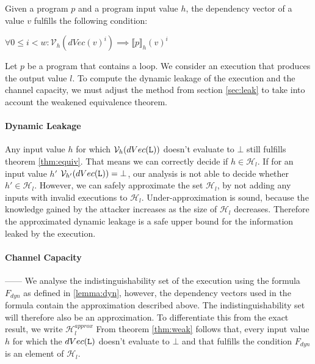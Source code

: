 \begin{theorem}\label{thm:weak}
    Given a program $p$ and a program input value $h$, the dependency vector of a value $v$ fulfills the following condition:
    \begin{center}
        $\forall 0 \leq i < w: \mathcal{V}_h(dVec(v)^i) \implies \llbracket p \rrbracket_h (v)^i$
    \end{center}
\end{theorem} 

Let $p$ be a program that contains a loop. We consider an execution that produces the output value $l$.
To compute the dynamic leakage of the execution and the channel capacity, we must adjust the method from section \ref{sec:leak} to take into account the weakened equivalence theorem.

\paragraph{Dynamic Leakage}
Any input value $h$ for which $\mathcal{V}_h(dVec(\mathtt{L}))$ doesn't evaluate to $\bot$ still fulfills theorem \ref{thm:equiv}. That means we can correctly decide if $h \in \mathcal{H}_l$. If for an input value $h'$ $\mathcal{V}_{h'}(dVec(\mathtt{L})) = \bot$, our analysis is not able to decide whether $h' \in \mathcal{H}_l$. However, we can safely approximate the set $\mathcal{H}_l$, by not adding any inputs with invalid executions to $\mathcal{H}_l$. Under-approximation is sound, because the knowledge gained by the attacker increases as the size of $\mathcal{H}_l$ decreases. Therefore the approximated dynamic leakage is a safe upper bound for the information leaked by the execution.

\paragraph{Channel Capacity}


------
We analyse the indistinguishability set of the execution using the formula $F_{dyn}$ as defined in \ref{lemma:dyn}, however, the dependency vectors used in the formula contain the approximation described above. The indistinguishability set will therefore also be an approximation. To differentiate this from the exact result, we write $\mathcal{H}_l^{approx}$
From theorem \ref{thm:weak} follows that, every input value $h$ for which the $dVec(\mathtt{L})$ doesn't evaluate to $\bot$ and that fulfills the condition $F_{dyn}$ is an element of $\mathcal{H}_l$.


